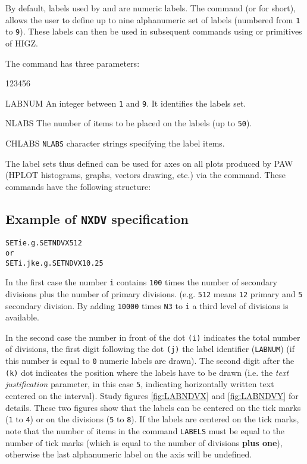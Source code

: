 By default, labels used by  and 
are numeric labels.
The command 
(or  for short), allows the user to define
up to nine alphanumeric set of labels
(numbered from \texttt{1} to \texttt{9}).
These labels can then be used in subsequent commands
using  or  primitives of HIGZ.

The  command has three parameters:
\begin{DLtt}{123456}
\item[LABNUM] An integer between \texttt{1} and \texttt{9}.
              It identifies the labels set.
\item[NLABS]  The number of items to be placed on the labels 
              (up to \texttt{50}).
\item[CHLABS] \texttt{NLABS} character strings specifying the label items.
\end{DLtt}

\newpage

The label sets thus defined can be used for axes on all plots produced
by PAW (HPLOT histograms, graphs, vectors drawing, etc.) via the
 command.
These commands have the following structure:

\subsection*{Example of \texttt{NXDV} specification}
\begin{alltt}
    SET  i            e.g. SET NDVX 512
{\rm or}
    SET  i.jk         e.g. SET NDVX 10.25
\end{alltt}

In the first case the number \texttt{i} contains
\texttt{100} times the 
number of secondary divisions plus the number of primary divisions.
(e.g. \texttt{512} means \texttt{12} primary and \texttt{5} secondary division. 
By adding \texttt{10000} times \texttt{N3} to \texttt{i} a third level of divisions
is available.

In the second case the number in front of the dot \texttt{(i)} indicates the total
number of divisions, the first digit following the dot \texttt{(j)} the label
identifier (\texttt{LABNUM}) (if this number is equal to \texttt{0} numeric labels
are drawn). The second digit after the \texttt{(k)} dot indicates the position 
where the  labels have to be drawn (i.e. the
{\em text justification} parameter, in this case \texttt{5}, indicating 
horizontally written text centered on the interval). Study figures 
\ref{fig:LABNDVX} and \ref{fig:LABNDVY} for details. These two figures show 
that the labels can be centered on the tick marks (\texttt{1} to \texttt{4}) or on 
the divisions (\texttt{5} to \texttt{8}). If the labels are centered on the tick 
marks, note that the number of items in the command \texttt{LABELS} must be equal
to the number of tick marks (which is equal to the number of divisions 
{\bf plus one}), otherwise the last alphanumeric label on the axis will be 
undefined. 


